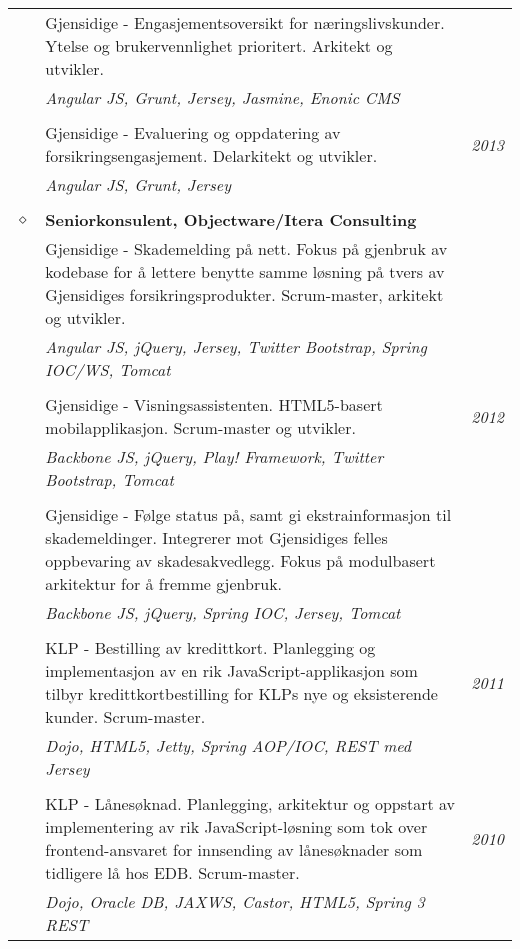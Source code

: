 \documentclass[overlapped,line,letterpaper]{res}
\begin{document}
\begin{resume}
\begin{tabularx}{\textwidth}{lXr}
& Gjensidige - Engasjementsoversikt for næringslivskunder. Ytelse og brukervennlighet
prioritert. Arkitekt og utvikler. & \\
& \small \textit{Angular JS, Grunt, Jersey, Jasmine, Enonic CMS} & \\
&& \\
& Gjensidige - Evaluering og oppdatering av forsikringsengasjement. Delarkitekt og utvikler. & \textit{2013} \\
& \small \textit{Angular JS, Grunt, Jersey} & \\
&& \\
$\diamond$	& \textbf{Seniorkonsulent, Objectware/Itera Consulting} 	& \\
& Gjensidige - Skademelding på nett. Fokus på gjenbruk av kodebase for å lettere benytte
samme løsning på tvers av Gjensidiges forsikringsprodukter. Scrum-master, arkitekt og utvikler. & \\
& \small \textit{Angular JS, jQuery, Jersey, Twitter Bootstrap, Spring IOC/WS, Tomcat} & \\
&& \\
& Gjensidige - Visningsassistenten. HTML5-basert mobilapplikasjon. Scrum-master og utvikler.
& \textit{2012}\\
& \small \textit{Backbone JS, jQuery, Play! Framework, Twitter Bootstrap, Tomcat} & \\
&&\\
& Gjensidige - Følge status på, samt gi ekstrainformasjon til skademeldinger. Integrerer mot
Gjensidiges felles oppbevaring av skadesakvedlegg. Fokus på modulbasert arkitektur for å fremme
gjenbruk.
& \\
& \small \textit{Backbone JS, jQuery, Spring IOC, Jersey, Tomcat} & \\
&&\\
& KLP - Bestilling av kredittkort. Planlegging og implementasjon av en rik
JavaScript-applikasjon som tilbyr kredittkortbestilling for 
KLPs nye og eksisterende kunder. Scrum-master. & \textit{2011} \\
& \small \textit{Dojo, HTML5, Jetty, Spring AOP/IOC, REST med Jersey} & \\
&&\\
& KLP - Lånesøknad. Planlegging, arkitektur og oppstart av implementering av rik
JavaScript-løsning som tok over frontend-ansvaret for innsending av
lånesøknader som tidligere lå hos EDB. Scrum-master. & \textit{2010} \\
& \small \textit{Dojo, Oracle DB, JAXWS, Castor, HTML5, Spring 3 REST} & \\
\end{tabularx}


\end{resume}
\end{document}

